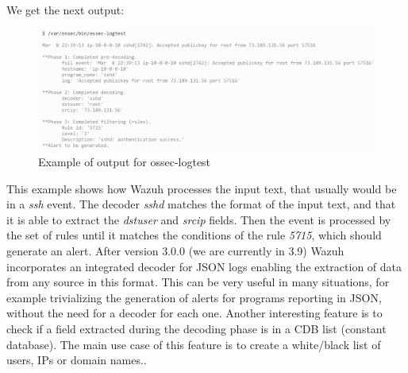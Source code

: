 \linej
We get the next output:
\begin{figure}[H]
  \centering
	\includegraphics[width=\textwidth]{figuras/ossec-logtest_output.png}
	\caption{Example of output for ossec-logtest}
\end{figure}
\linej
This example shows how Wazuh processes the input text, that usually would be in a \textit{ssh} event.
The decoder \textit{sshd} matches the format of the input text, and that it is able to extract the \textit{dstuser} and \textit{srcip} fields.
Then the event is processed by the set of rules until it matches the conditions of the rule \textit{5715}, which should generate an alert.
\linej
\linej
After version 3.0.0 (we are currently in 3.9) Wazuh incorporates an integrated decoder for JSON logs enabling the extraction of data from any source in this format. This can be very useful in many situations, for example trivializing the generation of alerts for programs reporting in JSON, without the need for a decoder for each one\cite{wazuh_json}.
\linej
\linej
Another interesting feature is to check if a field extracted during the decoding phase is in a CDB list (constant database). The main use case of this feature is to create a white/black list of users, IPs or domain names.\cite{wazuh_cdb}.
